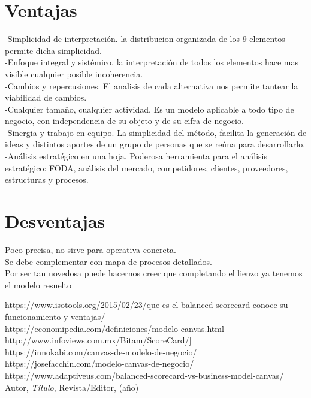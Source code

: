 \section{Ventajas}
\item{-Simplicidad de interpretación. la distribucion organizada de los  9 elementos permite dicha simplicidad.\\
-Enfoque integral y sistémico. la interpretación de todos los elementos hace mas visible cualquier posible incoherencia.\\
-Cambios y repercusiones. El analisis de cada alternativa nos permite tantear la viabilidad de cambios.\\
-Cualquier tamaño, cualquier actividad. Es un modelo aplicable a todo tipo de negocio, con independencia de su objeto y de su cifra de negocio.\\
-Sinergia y trabajo en equipo. La simplicidad del método, facilita la generación de ideas y distintos aportes de un grupo de personas que se reúna para desarrollarlo. \\
-Análisis estratégico en una hoja. Poderosa herramienta para el análisis estratégico: FODA, análisis del mercado, competidores, clientes, proveedores, estructuras y procesos.
}

\section{Desventajas}
\item{
Poco precisa, no sirve para operativa concreta.\\
Se debe complementar con mapa de procesos detallados.\\
Por ser tan novedosa puede hacernos creer que completando el lienzo ya tenemos el modelo resuelto}

\begin{thebibliography}{99}
https://www.isotools.org/2015/02/23/que-es-el-balanced-scorecard-conoce-su-funcionamiento-y-ventajas/\\
https://economipedia.com/definiciones/modelo-canvas.html\\
http://www.infoviews.com.mx/Bitam/ScoreCard/]\\
https://innokabi.com/canvas-de-modelo-de-negocio/\\
https://josefacchin.com/modelo-canvas-de-negocio/\\
https://www.adaptiveus.com/balanced-scorecard-vs-business-model-canvas/\\

 Autor, \emph{Título}, Revista/Editor, (año)

\end{thebibliography}



